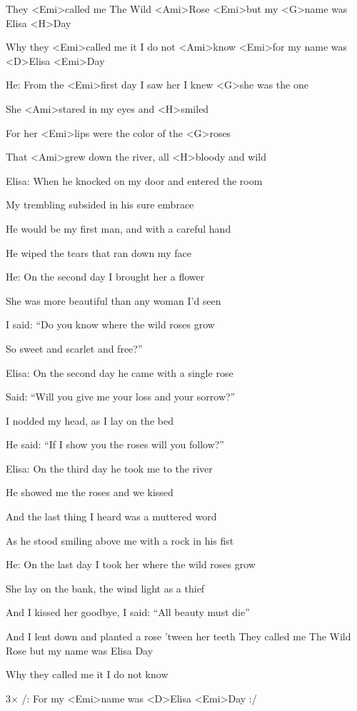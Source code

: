
\zr
They <Emi>called me The Wild <Ami>Rose <Emi>but my <G>name was Elisa <H>Day

Why they <Emi>called me it I do not <Ami>know <Emi>for my name was <D>Elisa <Emi>Day
\kr

He:
\zs
From the <Emi>first day I saw her I knew <G>she was the one 

She <Ami>stared in my eyes and <H>smiled

For her <Emi>lips were the color of the <G>roses 

That <Ami>grew down the river, all <H>bloody and wild
\ks

Elisa:
\zs
When he knocked on my door and entered the room

My trembling subsided in his sure embrace

He would be my first man, and with a careful hand

He wiped the tears that ran down my face
\ks

\zr \kr

He:
\zs
On the second day I brought her a flower

She was more beautiful than any woman I'd seen

I said: ``Do you know where the wild roses grow

So sweet and scarlet and free?''
\ks


Elisa:
\zs
On the second day he came with a single rose

Said: ``Will you give me your loss and your sorrow?''

I nodded my head, as I lay on the bed

He said: ``If I show you the roses will you follow?''
\ks

\zr \kr

Elisa:
\zs
On the third day he took me to the river

He showed me the roses and we kissed

And the last thing I heard was a muttered word

As he stood smiling above me with a rock in his fist 
\ks

He:
\zs
On the last day I took her where the wild roses grow

She lay on the bank, the wind light as a thief

And I kissed her goodbye, I said: ``All beauty must die''

And I lent down and planted a rose 'tween her teeth 
\ks
\zr
They called me The Wild Rose but my name was Elisa Day

Why they called me it I do not know

3× /: For my <Emi>name was <D>Elisa <Emi>Day :/
\kr

\kp
